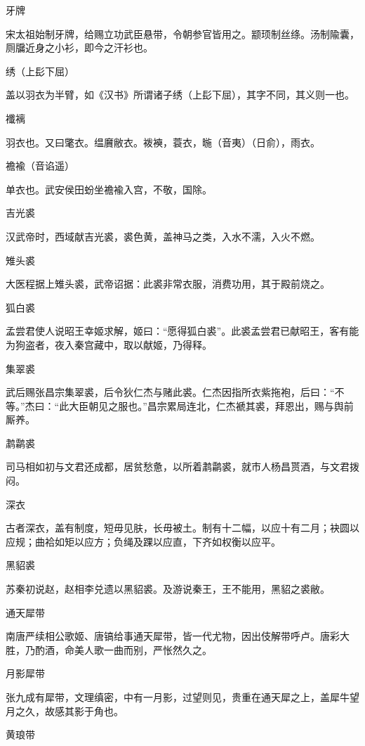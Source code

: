 \documentclass[a4paper,12pt,UTF8,twoside]{ctexbook}
\begin{document}
    牙牌
    
    宋太祖始制牙牌，给赐立功武臣悬带，令朝参官皆用之。颛顼制丝绦。汤制隃囊，厕牖近身之小衫，即今之汗衫也。
    
    绣（上髟下屈）
    
    盖以羽衣为半臂，如《汉书》所谓诸子绣（上髟下屈），其字不同，其义则一也。
    
    襳褵
    
    羽衣也。又曰氅衣。缊黂敝衣。袯襫，蓑衣，暆（音夷）（日俞），雨衣。
    
    襜褕（音谄遥）
    
    单衣也。武安侯田蚡坐襜褕入宫，不敬，国除。
    
    吉光裘
    
    汉武帝时，西域献吉光裘，裘色黄，盖神马之类，入水不濡，入火不燃。
    
    雉头裘
    
    大医程据上雉头裘，武帝诏据：此裘非常衣服，消费功用，其于殿前烧之。
    
    狐白裘
    
    孟尝君使人说昭王幸姬求解，姬曰：“愿得狐白裘”。此裘孟尝君已献昭王，客有能为狗盗者，夜入秦宫藏中，取以献姬，乃得释。
    
    集翠裘
    
    武后赐张昌宗集翠裘，后令狄仁杰与赌此裘。仁杰因指所衣紫拖袍，后曰：“不等。”杰曰：“此大臣朝见之服也。”昌宗累局连北，仁杰褫其裘，拜恩出，赐与舆前厮养。
    
    鹔鹴裘
    
    司马相如初与文君还成都，居贫愁惫，以所着鹔鹴裘，就市人杨昌贳酒，与文君拨闷。
    
    深衣
    
    古者深衣，盖有制度，短毋见肤，长毋被土。制有十二幅，以应十有二月；袂圆以应规；曲袷如矩以应方；负绳及踝以应直，下齐如权衡以应平。
    
    黑貂裘
    
    苏秦初说赵，赵相李兑遗以黑貂裘。及游说秦王，王不能用，黑貂之裘敝。
    
    通天犀带
    
    南唐严续相公歌姬、唐镐给事通天犀带，皆一代尤物，因出伎解带呼卢。唐彩大胜，乃酌酒，命美人歌一曲而别，严怅然久之。
    
    月影犀带
    
    张九成有犀带，文理缜密，中有一月影，过望则见，贵重在通天犀之上，盖犀牛望月之久，故感其影于角也。
    
    黄琅带
    
\end{document}
